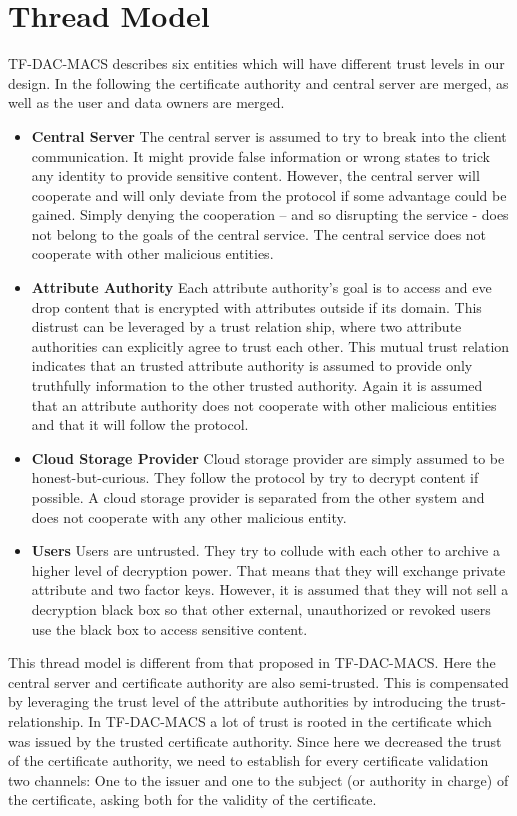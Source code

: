 \section{Thread Model}

TF-DAC-MACS describes six entities which will have different trust levels in our design. In the following the certificate authority and central server are merged, as well as the user and data owners are merged. 
\begin{itemize}
	\item \textbf{Central Server} The central server is assumed to try to break into the client communication. It might provide false information or wrong states to trick any identity to provide sensitive content. However, the central server will cooperate and will only deviate from the protocol if some advantage could be gained. Simply denying the cooperation – and so disrupting the service - does not belong to the goals of the central service. The central service does not cooperate with other malicious entities. 
	\item \textbf{Attribute Authority} Each attribute authority’s goal is to access and eve drop content that is encrypted with attributes outside if its domain.  This distrust can be leveraged by a trust relation ship, where two attribute authorities can explicitly agree to trust each other. This mutual trust relation indicates that an trusted attribute authority is assumed to provide only truthfully information to the other trusted authority. Again it is assumed that an attribute authority does not cooperate with other malicious entities and that it will follow the protocol.
	\item \textbf{Cloud Storage Provider} Cloud storage provider are simply assumed to be honest-but-curious. They follow the protocol by try to decrypt content if possible. A cloud storage provider is separated from the other system and does not cooperate with any other malicious entity.  
	\item \textbf{Users} Users are untrusted. They try to collude with each other to archive a higher level of decryption power. That means that they will exchange private attribute and two factor keys. However, it is assumed that they will not sell a decryption black box so that other external, unauthorized or revoked users use the black box to access sensitive content. 
\end{itemize}

This thread model is different from that proposed in TF-DAC-MACS. Here the central server and certificate authority are also semi-trusted. This is compensated by leveraging the trust level of the attribute authorities by introducing the trust-relationship. In TF-DAC-MACS a lot of trust is rooted in the certificate which was issued by the trusted certificate authority. Since here we decreased the trust of the certificate authority, we need to establish for every certificate validation two channels: One to the issuer and one to the subject (or authority in charge) of the certificate, asking both for the validity of the certificate. 